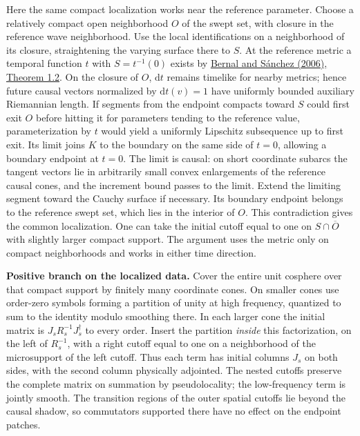 \documentclass[
  english,
  11pt,
  reqno]{amsart}
\begin{document}
Here the same compact localization works near the reference parameter.
Choose a relatively compact open neighborhood \(O\) of the swept set,
with closure in the reference wave neighborhood. Use the local
identifications on a neighborhood of its closure, straightening the
varying surface there to \(S\). At the reference metric a temporal
function \(t\) with \(S=t^{-1}(0)\) exists by
\hyperref[ref-BernalSanchez2006]{Bernal and Sánchez (2006), Theorem
1.2}. On the closure of \(O\), \(\mathrm dt\) remains timelike for
nearby metrics; hence future causal vectors normalized by
\(\mathrm dt(v)=1\) have uniformly bounded auxiliary Riemannian length.
If segments from the endpoint compacts toward \(S\) could first exit
\(O\) before hitting it for parameters tending to the reference value,
parameterization by \(t\) would yield a uniformly Lipschitz subsequence
up to first exit. Its limit joins \(K\) to the boundary on the same side
of \(t=0\), allowing a boundary endpoint at \(t=0\). The limit is
causal: on short coordinate subarcs the tangent vectors lie in
arbitrarily small convex enlargements of the reference causal cones, and
the increment bound passes to the limit. Extend the limiting segment
toward the Cauchy surface if necessary. Its boundary endpoint belongs to
the reference swept set, which lies in the interior of \(O\). This
contradiction gives the common localization. One can take the initial
cutoff equal to one on \(S\cap\overline O\) with slightly larger compact
support. The argument uses the metric only on compact neighborhoods and
works in either time direction.

\textbf{Positive branch on the localized data.} Cover the entire unit
cosphere over that compact support by finitely many coordinate cones. On
smaller cones use order-zero symbols forming a partition of unity at
high frequency, quantized to sum to the identity modulo smoothing there.
In each larger cone the initial matrix is \(J_sR_s^{-1}J_s^\dagger\) to
every order. Insert the partition \emph{inside} this factorization, on
the left of \(R_s^{-1}\), with a right cutoff equal to one on a
neighborhood of the microsupport of the left cutoff. Thus each term has
initial columns \(J_s\) on both sides, with the second column physically
adjointed. The nested cutoffs preserve the complete matrix on summation
by pseudolocality; the low-frequency term is jointly smooth. The
transition regions of the outer spatial cutoffs lie beyond the causal
shadow, so commutators supported there have no effect on the endpoint
patches.
\end{document}
